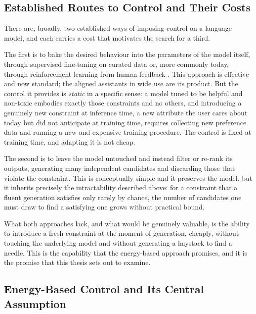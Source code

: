 \subsection{Established Routes to Control and Their Costs}
\label{sec:intro-routes}

There are, broadly, two established ways of imposing control on a language model, and each carries a cost that motivates the search for a third.

The first is to bake the desired behaviour into the parameters of the model itself, through supervised fine-tuning on curated data or, more commonly today, through reinforcement learning from human feedback \citep{ouyang2022training}. This approach is effective and now standard; the aligned assistants in wide use are its product. But the control it provides is \emph{static} in a specific sense: a model tuned to be helpful and non-toxic embodies exactly those constraints and no others, and introducing a genuinely new constraint at inference time, a new attribute the user cares about today but did not anticipate at training time, requires collecting new preference data and running a new and expensive training procedure. The control is fixed at training time, and adapting it is not cheap.

The second is to leave the model untouched and instead filter or re-rank its outputs, generating many independent candidates and discarding those that violate the constraint. This is conceptually simple and it preserves the model, but it inherits precisely the intractability described above: for a constraint that a fluent generation satisfies only rarely by chance, the number of candidates one must draw to find a satisfying one grows without practical bound.

What both approaches lack, and what would be genuinely valuable, is the ability to introduce a fresh constraint at the moment of generation, cheaply, without touching the underlying model and without generating a haystack to find a needle. This is the capability that the energy-based approach promises, and it is the promise that this thesis sets out to examine.

\subsection{Energy-Based Control and Its Central Assumption}
\label{sec:intro-ebm}


